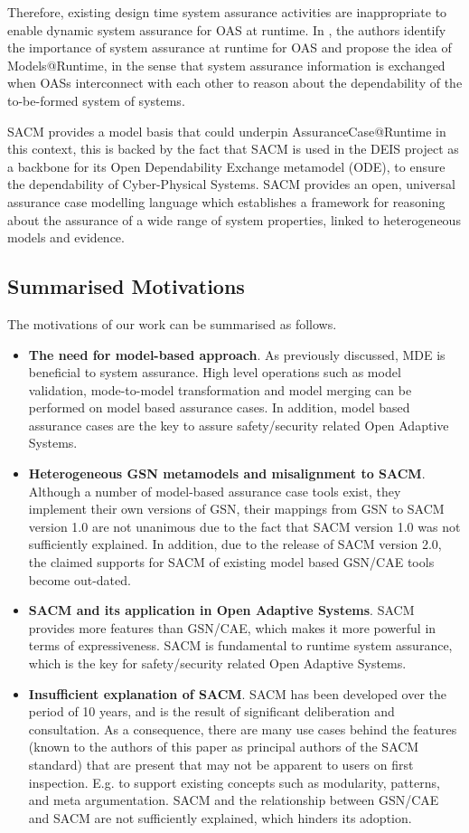 Therefore, existing design time system assurance activities are inappropriate to enable dynamic system assurance for OAS at runtime. 
In \cite{trapp2013safety}, the authors identify the importance of system assurance at runtime for OAS and propose the idea of Models@Runtime, in the sense that system assurance information is exchanged when OASs interconnect with each other to reason about the dependability of the to-be-formed system of systems.

SACM provides a model basis that could underpin AssuranceCase@Runtime in this context, this is backed by the fact that SACM is used in the DEIS project \cite{wei2017deis} as a backbone for its Open Dependability Exchange metamodel (ODE), to ensure the dependability of Cyber-Physical Systems. SACM provides an open, universal assurance case modelling language which establishes a framework for reasoning about the assurance of a wide range of system properties, linked to heterogeneous models and evidence. 

\subsection{Summarised Motivations}
The motivations of our work can be summarised as follows. 
\begin{itemize}
	\item \textbf{The need for model-based approach}. 
	As previously discussed, MDE is beneficial to system assurance. 
	High level operations such as model validation, mode-to-model transformation and model merging can be performed on model based assurance cases. In addition, model based assurance cases are the key to assure safety/security related Open Adaptive Systems.
	\item \textbf{Heterogeneous GSN metamodels and misalignment to SACM}.
	Although a number of model-based assurance case tools exist, they implement their own versions of GSN, their mappings from GSN to SACM version 1.0 are not unanimous due to the fact that SACM version 1.0 was not sufficiently explained. 
	In addition, due to the release of SACM version 2.0, the claimed supports for SACM of existing model based GSN/CAE tools become out-dated.
	\item \textbf{SACM and its application in Open Adaptive Systems}. SACM provides more features than GSN/CAE, which makes it more powerful in terms of expressiveness. 
	SACM is fundamental to runtime system assurance, which is the key for safety/security related Open Adaptive Systems.
	\item \textbf{Insufficient explanation of SACM}. SACM has been developed over the period of 10 years, and is the result of significant deliberation and consultation. As a consequence, there are many use cases behind the features (known to the authors of this paper as principal authors of the SACM standard) that are present that may not be apparent to users on first inspection.
	E.g. to support existing concepts such as modularity, patterns, and meta argumentation. 
	SACM and the relationship between GSN/CAE and SACM are not sufficiently explained, which hinders its adoption. 
\end{itemize}
